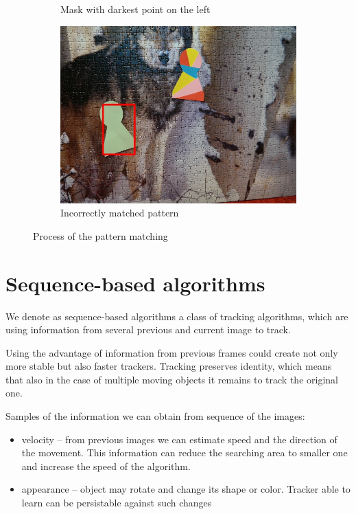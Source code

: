 \begin{figure}
\begin{subfigure}{0.48\linewidth}
    \caption{Mask with darkest point on the left}
  \end{subfigure}
  \begin{subfigure}{0.48\linewidth}
    \includegraphics[width=\linewidth]{img/pattern_matching/result-incorrect.jpg}
    \caption{Incorrectly matched pattern}
  \end{subfigure}
  \caption{Process of the pattern matching}
  \label{fig:pattern-matching-tracker}
\end{figure}



\section{Sequence-based algorithms}

We denote as sequence-based algorithms a class of tracking algorithms, which
are using information from several previous and current image to track.

Using the advantage of information from previous frames could create not only
more stable but also faster trackers. Tracking preserves identity, which means
that also in the case of multiple moving objects it remains to track the original
one.

Samples of the information we can obtain from sequence of the images:
\begin{itemize}
\item velocity -- from previous images we can estimate speed and the direction of
  the movement. This information can reduce the searching area to smaller one
  and increase the speed of the algorithm.
\item appearance -- object may rotate and change its shape or color. Tracker able to
  learn can be persistable against such changes
\end{itemize}

